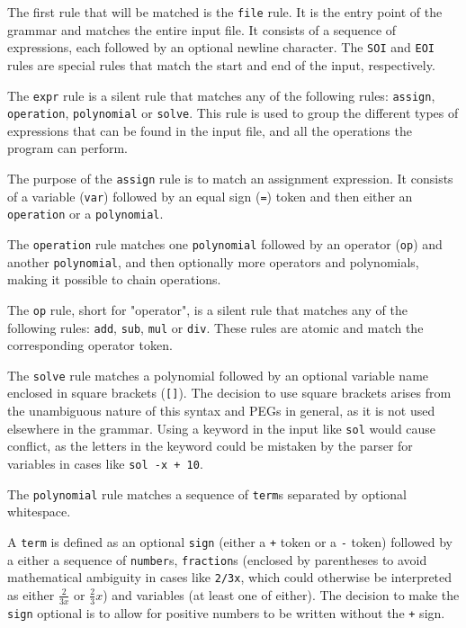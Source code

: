 The first rule that will be matched is the \verb|file| rule. It is the entry point of the grammar and matches the entire input file. It consists of a sequence of expressions, each followed by an optional newline character. The \verb|SOI| and \verb|EOI| rules are special rules that match the start and end of the input, respectively.

The \verb|expr| rule is a silent rule that matches any of the following rules: \verb|assign|, \verb|operation|, \verb|polynomial| or \verb|solve|. This rule is used to group the different types of expressions that can be found in the input file, and all the operations the program can perform.

The purpose of the \verb|assign| rule is to match an assignment expression. It consists of a variable (\verb|var|) followed by an equal sign (\verb|=|) token and then either an \verb|operation| or a \verb|polynomial|.

The \verb|operation| rule matches one \verb|polynomial| followed by an operator (\verb|op|) and another \verb|polynomial|, and then optionally more operators and polynomials, making it possible to chain operations.

The \verb|op| rule, short for "operator", is a silent rule that matches any of the following rules: \verb|add|, \verb|sub|, \verb|mul| or \verb|div|. These rules are atomic and match the corresponding operator token.

The \verb|solve| rule matches a polynomial followed by an optional variable name enclosed in square brackets (\verb|[]|). The decision to use square brackets arises from the unambiguous nature of this syntax and PEGs in general, as it is not used elsewhere in the grammar. Using a keyword in the input like \verb|sol| would cause conflict, as the letters in the keyword could be mistaken by the parser for variables in cases like \verb|sol -x + 10|.

The \verb|polynomial| rule matches a sequence of \verb|term|s separated by optional whitespace.

A \verb|term| is defined as an optional \verb|sign| (either a \verb|+| token or a \verb|-| token) followed by a either a sequence of \verb|number|s, \verb|fraction|s (enclosed by parentheses to avoid mathematical ambiguity in cases like \verb|2/3x|, which could otherwise be interpreted as either $\frac{2}{3x}$ or $\frac{2}{3}x$) and variables (at least one of either). The decision to make the \verb|sign| optional is to allow for positive numbers to be written without the \verb|+| sign.

